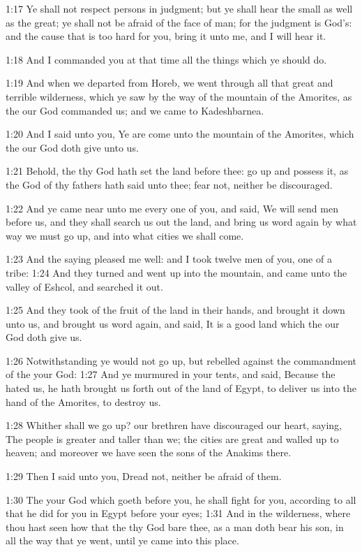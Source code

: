 1:17 Ye shall not respect persons in judgment; but ye shall hear the
small as well as the great; ye shall not be afraid of the face of man;
for the judgment is God's: and the cause that is too hard for you,
bring it unto me, and I will hear it.

1:18 And I commanded you at that time all the things which ye should
do.

1:19 And when we departed from Horeb, we went through all that great
and terrible wilderness, which ye saw by the way of the mountain of
the Amorites, as the \LORD our God commanded us; and we came to
Kadeshbarnea.

1:20 And I said unto you, Ye are come unto the mountain of the
Amorites, which the \LORD our God doth give unto us.

1:21 Behold, the \LORD thy God hath set the land before thee: go up and
possess it, as the \LORD God of thy fathers hath said unto thee; fear
not, neither be discouraged.

1:22 And ye came near unto me every one of you, and said, We will send
men before us, and they shall search us out the land, and bring us
word again by what way we must go up, and into what cities we shall
come.

1:23 And the saying pleased me well: and I took twelve men of you, one
of a tribe: 1:24 And they turned and went up into the mountain, and
came unto the valley of Eshcol, and searched it out.

1:25 And they took of the fruit of the land in their hands, and
brought it down unto us, and brought us word again, and said, It is a
good land which the \LORD our God doth give us.

1:26 Notwithstanding ye would not go up, but rebelled against the
commandment of the \LORD your God: 1:27 And ye murmured in your tents,
and said, Because the \LORD hated us, he hath brought us forth out of
the land of Egypt, to deliver us into the hand of the Amorites, to
destroy us.

1:28 Whither shall we go up? our brethren have discouraged our heart,
saying, The people is greater and taller than we; the cities are great
and walled up to heaven; and moreover we have seen the sons of the
Anakims there.

1:29 Then I said unto you, Dread not, neither be afraid of them.

1:30 The \LORD your God which goeth before you, he shall fight for you,
according to all that he did for you in Egypt before your eyes; 1:31
And in the wilderness, where thou hast seen how that the \LORD thy God
bare thee, as a man doth bear his son, in all the way that ye went,
until ye came into this place.

